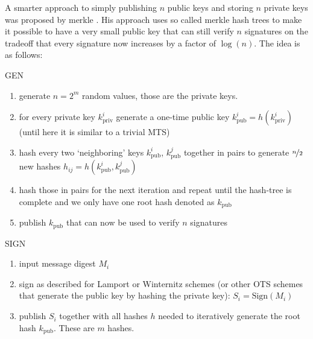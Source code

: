 \documentclass[conference]{IEEEtran}
\begin{document}
A smarter approach to simply publishing $n$ public keys and storing $n$ private keys was proposed by merkle \cite{merkle_ots}.
His approach uses so called merkle hash trees to make it possible to have a very small public key that can still verify $n$ signatures on the tradeoff that every signature now increases by a factor of $\log(n)$.
The idea is as follows:

\begin{algorithm}
\caption{GEN}\label{merkle gen v1}
    \begin{enumerate}
        \item generate $n=2^m$ random values, those are the private keys.
        \item for every private key $k_\text{priv}^i$ generate a one-time public key $k_\text{pub}^i=h(k_\text{priv}^i)$ (until here it is similar to a trivial MTS)
        \item hash every two `neighboring' keys $k_\text{pub}^i$, $k_\text{pub}^j$ together in pairs to generate $\nicefrac{n}{2}$ new hashes $h_{ij}=h(k_\text{pub}^i, k_\text{pub}^j)$ 
        \item hash those in pairs for the next iteration and repeat until the hash-tree is complete and we only have one root hash denoted as $k_\text{pub}$
        \item publish $k_\text{pub}$ that can now be used to verify $n$ signatures
    \end{enumerate}
\end{algorithm}

\begin{algorithm}
    \caption{SIGN}\label{merkle sig v1}
        \begin{enumerate}
            \item input message digest $M_i$
            \item sign as described for Lamport or Winternitz schemes (or other OTS schemes that generate the public key by hashing the private key): $S_i=\text{Sign}(M_i)$
            \item publish $S_i$ together with all hashes $h$ needed to iteratively generate the root hash $k_\text{pub}$. These are $m$ hashes.
        \end{enumerate}
    \end{algorithm}
\end{document}

